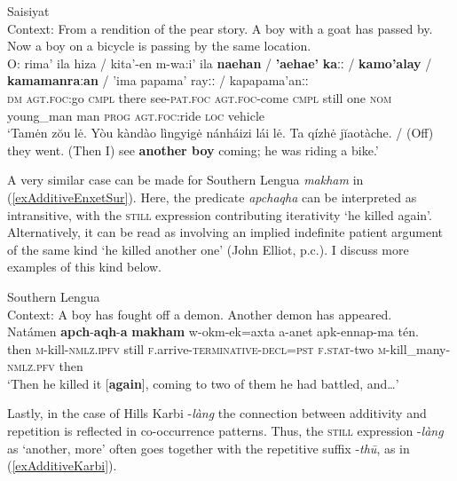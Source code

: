 \begin{exe}
	\ex Saisiyat\label{exAdditiveSaisiyat}\\
	Context: From a rendition of the pear story. A boy with a goat has passed by. Now a boy on a bicycle is passing by the same location.\\
	\gll O: rima\rq{} ila hiza / kita’-en m-wa:i\rq{} ila \textbf{naehan} / \textbf{\rq{}aehae\rq}{} \textbf{kaːː} / \textbf{kamo\rq{}alay} / \textbf{kamamanraːan} / \rq{}ima papama\rq{} rayːː / kapapama\rq{}anːː\\
	\textsc{dm} \textsc{agt}.\textsc{foc}:go \textsc{cmpl} there {} see-\textsc{pat}.\textsc{foc} \textsc{agt}.\textsc{foc}-come \textsc{cmpl} still  {} one \textsc{nom} {} young\_man {} man {} \textsc{prog} \textsc{agt}.\textsc{foc}:ride \textsc{loc} {} vehicle\\
	\glt \lq Tamėn zŏu lė. Yòu kàndào lìngyigė nánháizi lái lė. Ta qízhė jĭaotàche. / (Off) they went. (Then I) see \textbf{another boy} coming; he was riding a bike.’ \parencite[108–109]{Huang2008}
\end{exe} 

A very similar case can be made for Southern Lengua \textit{makham} in (\ref{exAdditiveEnxetSur}). Here, the predicate \textit{apchaqha} can be interpreted as intransitive, with the \textsc{still} expression contributing iterativity \lq he killed again'. Alternatively, it can be read as involving an implied indefinite patient argument of the same kind \lq he killed another one\rq{ }(John Elliot, p.c.). I discuss more examples of this kind below.

\begin{exe}
	\ex Southern Lengua\label{exAdditiveEnxetSur}\\
	Context: A boy has fought off a demon. Another demon has appeared.\\
	\gll Natámen \textbf{apch}-\textbf{aqh}-\textbf{a} \textbf{makham} w-okm-ek=axta a-anet apk-ennap-ma tén.\\
	then \textsc{m}-kill-\textsc{nmlz}.\textsc{ipfv} still \textsc{f}.arrive-\textsc{terminative}-\textsc{decl}=\textsc{pst} \textsc{f}.\textsc{stat}-two \textsc{m}-kill\_many-\textsc{nmlz}.\textsc{pfv} then\\
	\glt \lq Then he killed it [\textbf{again}], coming to two of them he had battled, and…' \parencite[757]{Elliot2021}
\end{exe}

Lastly, in the case of Hills Karbi \mbox{-\textit{làng}} the connection between additivity and repetition is reflected in co-occurrence patterns. Thus, the \textsc{still} expression \mbox{-\textit{làng}} as \lq another, more\rq{ }often goes together with the repetitive suffix \mbox{-\textit{thū}}, as in (\ref{exAdditiveKarbi}).

